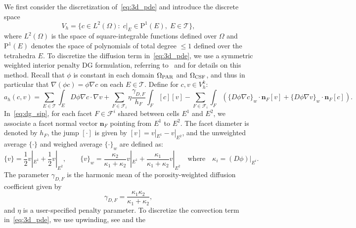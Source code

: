 We first consider the discretization of~\eqref{eq:3d_pde} and
introduce the discrete space
\begin{equation}
  V_h = \{c \in L^2(\Omega): \;  c \vert_E \in \mathrm{P}^1(E), \; E \in \mathcal{T}\} ,
\end{equation}
where $L^2(\Omega)$ is the space of square-integrable functions
defined over $\Omega$ and $\mathrm{P}^1(E)$ denotes the space of
polynomials of total degree $\leqslant 1$ defined over the tetrahedra
$E$. To discretize the diffusion term in~\eqref{eq:3d_pde}, we use a
symmetric weighted interior penalty DG formulation, referring
to~\cite{ern2009discontinuous} and \cite[Section
  4.5.2.3]{di2011mathematical} for details on this
method. Recall that $\phi$ is constant in each domain
  $\Omega_{\rm PAR}$ and $\Omega_{\rm CSF}$, and thus in particular
  that $\nabla (\phi c) = \phi \nabla c$ on each $E \in \mathcal{T}$.
Define for $c, v \in V_h^k$:
\begin{equation}
  a_h (c, v)
  =
  \sum_{E \in \mathcal{T}} \int_{E} D\phi \nabla c \cdot \nabla v
  + \sum_{F \in \mathcal{F}_i} \eta \frac{\gamma_{D,F}}{h_F} \int_{F} [c][v] 
  - \sum_{F \in \mathcal{F}_i} \int_{F} \left( \{D \phi \nabla c \}_w \cdot \bm n_F [v]
  + \{D \phi \nabla v \}_w \cdot \bm n_F [c] \right).
  \label{eq:dg_sip}
\end{equation}
In~\eqref{eq:dg_sip}, for each facet $F \in \mathcal{F}^i$ shared
between cells $E^1$ and $E^2$, we associate a  facet normal vector $\bm n_F$
pointing from $E^1$ to $E^2$. The facet diameter is denoted by $h_F$,
the jump $[\cdot]$ is given by $[v] = v|_{E^1} - v|_{E^2}$, and the
unweighted average $\{ \cdot \}$ and weighed average $\{ \cdot \}_w$
are defined as:
\begin{equation}
  \{v\} = \frac12 v |_{E^1} + \frac12 v |_{E^2}, \qquad
  \{v\}_{w} = \frac{\kappa_2}{\kappa_1 + \kappa_2} v |_{E^1} + \frac{\kappa_1}{\kappa_1 + \kappa_2} v |_{E^2}
  \quad \text{where} \quad \kappa_i = (D \phi) |_{E^i}.  
\end{equation}
The parameter $\gamma_{D,F}$ is the harmonic mean of the
porosity-weighted diffusion coefficient given by
\begin{equation}
  \gamma_{D,F} = \frac{\kappa_1\kappa_2}{\kappa_1 + \kappa_2},
\end{equation}
and $\eta$ is a user-specified penalty parameter. To discretize the convection term in~\eqref{eq:3d_pde}, we use
upwinding, see \cite[Section 2.3.1]{di2011mathematical} and the
